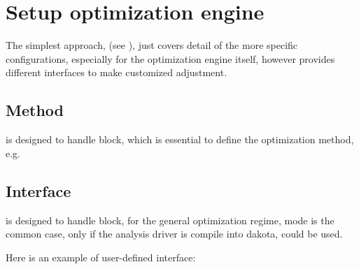 \documentclass[letterpaper,10pt,english]{sphinxmanual}
\begin{document}
\section{Setup optimization engine}
\label{\detokenize{src/demos/demo4::doc}}\label{\detokenize{src/demos/demo4:setup-optimization-engine}}
The simplest approach, (see {\hyperref[\detokenize{src/demos/demo1:simplest-approach}]{}}), just covers detail
of the more specific configurations, especially for the optimization engine
itself, however  provides different interfaces to make customized
adjustment.


\subsection{Method}
\label{\detokenize{src/demos/demo4:method}}
 is designed to handle  block, which is essential
to define the optimization method, e.g.

\begin{sphinxVerbatim}[commandchars=\\\{\},formatcom=\scriptsize]
   
\end{sphinxVerbatim}


\subsection{Interface}
\label{\detokenize{src/demos/demo4:interface}}
 is designed to handle  block, for the
general optimization regime,  mode is the common case, only if
the analysis driver is compile into dakota,  could be used.

Here is an example of user-defined interface:
\end{document}
